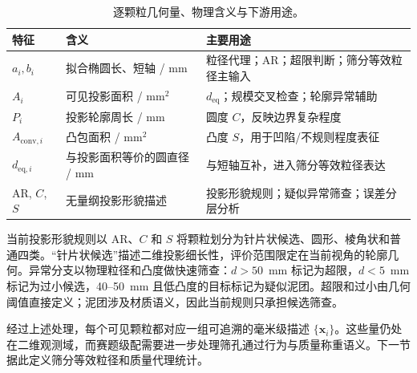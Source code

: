 \begin{table}[t]
\centering
\caption{逐颗粒几何量、物理含义与下游用途。}
\label{tab:r-features}
\footnotesize
\renewcommand{\arraystretch}{1.12}
\begin{tabular}{>{\centering\arraybackslash}p{2.2cm}>{\raggedright\arraybackslash}p{4.2cm}>{\raggedright\arraybackslash}p{6.4cm}}
\toprule
特征 & 含义 & 主要用途 \\
\midrule
$a_i,b_i$ & 拟合椭圆长、短轴 / mm & 粒径代理；AR；超限判断；筛分等效粒径主输入 \\
$A_i$ & 可见投影面积 / mm$^2$ & $d_{\mathrm{eq}}$；规模交叉检查；轮廓异常辅助 \\
$P_i$ & 投影轮廓周长 / mm & 圆度 $C$，反映边界复杂程度 \\
$A_{\mathrm{conv},i}$ & 凸包面积 / mm$^2$ & 凸度 $S$，用于凹陷/不规则程度表征 \\
$d_{\mathrm{eq},i}$ & 与投影面积等价的圆直径 / mm & 与短轴互补，进入筛分等效粒径表达 \\
AR, $C$, $S$ & 无量纲投影形貌描述 & 投影形貌规则；疑似异常筛查；误差分层分析 \\
\bottomrule
\end{tabular}
\end{table}

当前投影形貌规则以 AR、$C$ 和 $S$ 将颗粒划分为针片状候选、圆形、棱角状和普通四类。“针片状候选”描述二维投影细长性，评价范围限定在当前视角的轮廓几何。异常分支以物理粒径和凸度做快速筛查：$d>50$~mm 标记为超限，$d<5$~mm 标记为过小候选，40--50~mm 且低凸度的目标标记为疑似泥团。超限和过小由几何阈值直接定义；泥团涉及材质语义，因此当前规则只承担候选筛查。

经过上述处理，每个可见颗粒都对应一组可追溯的毫米级描述 $\{\mathbf{x}_i\}$。这些量仍处在二维观测域，而赛题级配需要进一步处理筛孔通过行为与质量称重语义。下一节据此定义筛分等效粒径和质量代理统计。